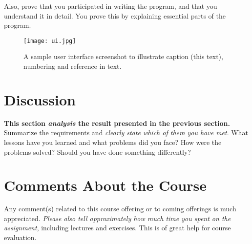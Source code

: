 \documentclass[a4paper]{scrartcl}
\begin{document}
Also, prove that you participated in writing the program, and that you understand it in detail. You prove this by explaining essential parts of the program.

\begin{figure}[h!]
  \begin{center}
    \texttt{[image: ui.jpg]}
    \caption{A sample user interface screenshot to illustrate caption (this text), numbering and reference in text.}
    \label{fig:ui}
  \end{center}
\end{figure}

\section{Discussion}

\textbf{This section \textit{analysis} the result presented in the previous section.} \\

\noindent Summarize the requirements and \textit{clearly state which of them you have met}. What lessons have you learned and what problems did you face? How were the problems solved? Should you have done something differently?

\section{Comments About the Course}

Any comment(s) related to this course offering or to coming offerings is much appreciated. \textit{Please also tell approximately how much time you spent on the assignment}, including lectures and exercises. This is of great help for course evaluation.
\end{document}
